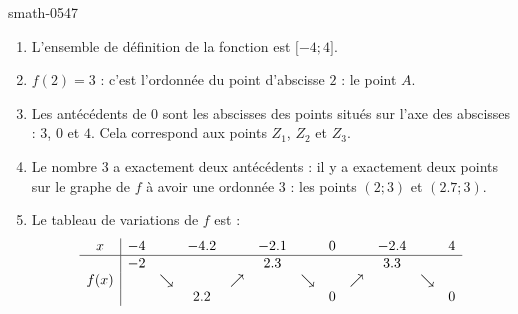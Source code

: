
\begin{corrige}{smath-0547}


    \begin{center}
   
    \end{center}

    \begin{enumerate}
        \item
            L'ensemble de définition de la fonction est \( \mathopen[ -4 ; 4 \mathclose]\).
        \item
            \( f(2)=3\) : c'est l'ordonnée du point d'abscisse \( 2\) : le point \( A\).
        \item
            Les antécédents de \( 0\) sont les abscisses des points situés sur l'axe des abscisses : \( 3\), \( 0\) et \( 4\). Cela correspond aux points \( Z_1\), \( Z_2\) et \( Z_3\).
        \item
            Le nombre \( 3\) a exactement deux antécédents : il y a exactement deux points sur le graphe de \( f\) à avoir une ordonnée \( 3\) : les points \( (2;3)\) et \( (2.7;3)\).
        \item
            Le tableau de variations de \( f\) est :
            \begin{equation*}
                \begin{array}[]{c|ccccccccccc}
                    x&-4&&-4.2&&-2.1&&0&&-2.4&&4\\
                    \hline
                    &-2&&&&2.3&&&&3.3&&\\
                    f(x)&&\searrow&&\nearrow&&\searrow&&\nearrow&&\searrow&\\
                    &&&2.2&&&&0&&&&0\\
                \end{array}
            \end{equation*}


\end{enumerate}
\end{corrige}
